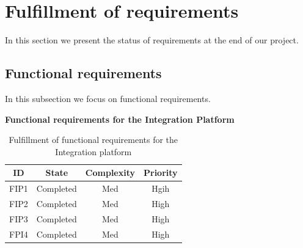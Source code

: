 \iffalse
\section{Fulfillment of requirements}

In this section we present the status of requirements at the end of our project.

\subsection{Functional requirements}

In this subsection we focus on functional requirements.

\textbf{Functional requirements for the Integration Platform}

\begin{table}[H]
\begin{center}
\begin{tabular}{ | c | c | c | c | }
  \hline
  \textbf{ID} & \textbf{State} & \textbf{Complexity} & \textbf{Priority} \\
  \hline\noalign{\smallskip}\noalign{\smallskip}\hline
  FIP1	& Completed & Med & Hgih \\
  FIP2	& Completed & Med & High \\
  FIP3	& Completed & Med & High \\
  FPI4	& Completed & Med & High \\
  \hline
\end{tabular}
\end{center}
\caption{Fulfillment of functional requirements for the Integration platform}
\label{table:fulfillemntofrequirements}
\end{table}


